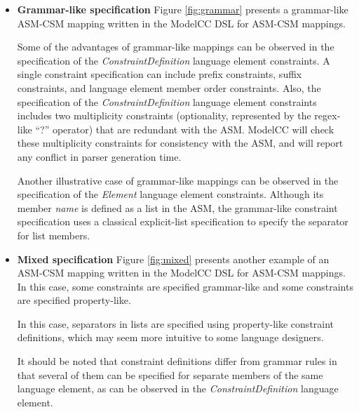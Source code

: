 \documentclass[floatfix,rmp,twocolumn,twoside]{revtex4}
\begin{document}
\begin{itemize}
\begin{figure*}[p]
\centering
\begin{varwidth}{0.99\linewidth}
\begin{verbatim}
ConstraintDefinition: "[" constraintID "]"
ConstraintDefinition: ":" constraint
Element.name[separator]: "."
Identifier.name: "[a-zA-Z][a-zA-Z0-9_]*"
ClausureSpecification: constraint "\*"
OptionalSpecification: constraint "\?"
PositiveClauseSpecification: constraint "\+"
ParenthesizedSpecification: "\(" constraint "\)"
ConstraintSpecification: SequenceSpecification < PrecedenceSpecification
                         < AlternationSpecification 
AlternationSpecification.constraints[separator]: "\|"
PrecedenceSpecification.constraints[separator]: "\<"
Boolean.value: "true|false"
Integer.value: "[0-9]+"
\end{verbatim}
 \end{varwidth}
\caption{Mixed specification of the mapping from the abstract syntax model to the concrete syntax model of ModelCC DSL for ASM-CSM mappings, written in the ModelCC DSL for ASM-CSM mappings itself.}
\label{fig:mixed}
\end{figure*}
\item {\bf Grammar-like specification} Figure \ref{fig:grammar} presents a grammar-like ASM-CSM mapping written in the ModelCC DSL for ASM-CSM mappings.

Some of the advantages of grammar-like mappings can be observed in the specification of the \emph{ConstraintDefinition} language element constraints.
A single constraint specification can include prefix constraints, suffix constraints, and language element member order constraints.
Also, the specification of the \emph{ConstraintDefinition} language element constraints includes two multiplicity constraints (optionality, represented by the regex-like ``?'' operator) that are redundant with the ASM.
ModelCC will check these multiplicity constraints for consistency with the ASM, and will report any conflict in parser generation time.

Another illustrative case of grammar-like mappings can be observed in the specification of the \emph{Element} language element constraints.
Although its member \emph{name} is defined as a list in the ASM, the grammar-like constraint specification uses a classical explicit-list specification to specify the separator for list members.


\item {\bf Mixed specification} Figure \ref{fig:mixed} presents another example of an ASM-CSM mapping written in the ModelCC DSL for ASM-CSM mappings. In this case, some constraints are specified grammar-like and some constraints are specified property-like.

In this case, separators in lists are specified using property-like constraint definitions, which may seem more intuitive to some language designers.

It should be noted that constraint definitions differ from grammar rules in that several of them can be specified for separate members of the same language element, as can be observed in the \emph{ConstraintDefinition} language element.
\end{itemize}
\end{document}
